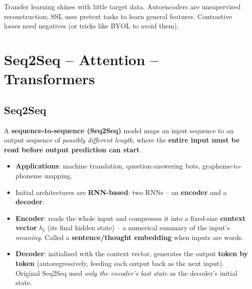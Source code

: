 \documentclass[10pt,a4paper]{article}
\begin{document}
	\begin{examtipbox}
		Transfer learning shines with little target data. Autoencoders are unsupervised reconstruction; SSL uses pretext tasks to learn general features. Contrastive losses need negatives (or tricks like BYOL to avoid them).
	\end{examtipbox}

	\section{Seq2Seq -- Attention -- Transformers}
	
	\subsection{Seq2Seq}

	\begin{definitionbox}
		A \textbf{sequence-to-sequence (Seq2Seq)} model maps an input sequence to an output sequence of \emph{possibly different length}, where the \textbf{entire input must be read before output prediction can start}.
	\end{definitionbox}

	\begin{itemize}[leftmargin=*]
		\item \textbf{Applications}: machine translation, question-answering bots, grapheme-to-phoneme mapping.
		\item Initial architectures are \textbf{RNN-based}: two RNNs -- an \textbf{encoder} and a \textbf{decoder}.
		\item \textbf{Encoder}: reads the whole input and compresses it into a fixed-size \textbf{context vector} $h_t$ (its final hidden state) -- a numerical summary of the input's \emph{meaning}. Called a \textbf{sentence/thought embedding} when inputs are words.
		\item \textbf{Decoder}: initialised with the context vector, generates the output \textbf{token by token} (autoregressively, feeding each output back as the next input). Original Seq2Seq used \emph{only the encoder's last state} as the decoder's initial state.
	\end{itemize}
\end{document}
